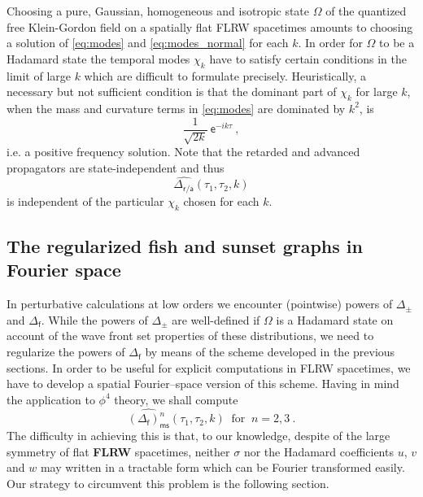 \documentclass[12pt]{book}
\newcommand{\ms}{\mathsf{ms}}
\newcommand{\asf}{\mathsf{a}}
\newcommand{\esf}{\mathsf{e}}
\newcommand{\fsf}{\mathsf{f}}
\newcommand{\rsf}{\mathsf{r}}
\theoremstyle{break}
\begin{document}
%
Choosing a pure, Gaussian, homogeneous and isotropic state $\Omega$ of the quantized free Klein-Gordon field on a spatially flat FLRW spacetimes amounts to choosing a solution of \eqref{eq:modes} and \eqref{eq:modes_normal} for each $k$. In order for $\Omega$ to be a Hadamard state the temporal modes $\chi_k$ have to satisfy certain conditions in the limit of large $k$ which are difficult to formulate precisely. Heuristically, a necessary but not sufficient condition is that the dominant part of $\chi_k$ for large $k$, when the mass and curvature terms in \eqref{eq:modes} are dominated by $k^2$, is 
%
\begin{equation*}
\frac{1}{\sqrt{2k}} \ \esf^{-ik\tau} \ , 
\end{equation*}
%
i.e. a positive frequency solution. Note that the retarded and advanced propagators are state-independent and thus 
%
\begin{equation*}
\widehat{\Delta_{\rsf/\asf}}(\tau_1,\tau_2,k) 
\end{equation*}
%
is independent of the particular $\chi_k$ chosen for each $k$.


\subsection{The regularized fish and sunset graphs in Fourier space}\label{p:SUNSET_FISH_FLWR}


In perturbative calculations at low orders we encounter (pointwise) powers of $\Delta_\pm$ and $\Delta_\fsf$. While the powers of $\Delta_\pm$ are well-defined if $\Omega$ is a Hadamard state on account of the wave front set properties of these distributions, we need to regularize the powers of $\Delta_\fsf$ by means of the scheme developed in the previous sections. In order to be useful for explicit computations in FLRW spacetimes, we have to develop a spatial Fourier--space version of this scheme. Having in mind the application to $\phi^4$ theory, we shall compute 
%
\begin{equation*}
\widehat{(\Delta_\fsf)^n_\ms}(\tau_1,\tau_2,k) \ \mbox{ for } \ n = 2 , 3 \ . 
\end{equation*}
%
The difficulty in achieving this is that, to our knowledge, despite of the large symmetry of flat \textbf{FLRW} spacetimes, neither $\sigma$ nor the Hadamard coefficients $u$, $v$ and $w$ may written in a tractable form which can be Fourier transformed easily. Our strategy to circumvent this problem is the following section.
\end{document}
